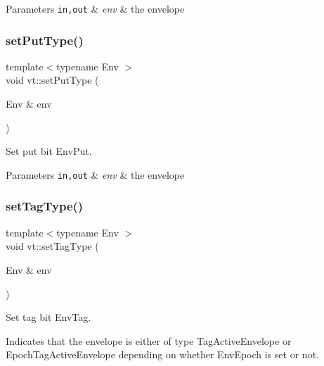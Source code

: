 \begin{DoxyParams}[1]{Parameters}
\mbox{\tt in,out}  & {\em env} & the envelope \\
\hline
\end{DoxyParams}
\mbox{\label{namespacevt_ab25ac0a12270d261c2f5c3c634f6370e}} 
\subsubsection{\texorpdfstring{set\+Put\+Type()}{setPutType()}}
{\footnotesize\ttfamily template$<$typename Env $>$ \\
void vt\+::set\+Put\+Type (\begin{DoxyParamCaption}\item[{Env \&}]{env }\end{DoxyParamCaption})\hspace{0.3cm}{\ttfamily [inline]}}



Set put bit {\ttfamily Env\+Put}. 


\begin{DoxyParams}[1]{Parameters}
\mbox{\tt in,out}  & {\em env} & the envelope \\
\hline
\end{DoxyParams}
\mbox{\label{namespacevt_ad088db89648b82eef7ca9b4837a907cd}} 
\subsubsection{\texorpdfstring{set\+Tag\+Type()}{setTagType()}}
{\footnotesize\ttfamily template$<$typename Env $>$ \\
void vt\+::set\+Tag\+Type (\begin{DoxyParamCaption}\item[{Env \&}]{env }\end{DoxyParamCaption})\hspace{0.3cm}{\ttfamily [inline]}}



Set tag bit {\ttfamily Env\+Tag}. 

Indicates that the envelope is either of type {\ttfamily Tag\+Active\+Envelope} or {\ttfamily Epoch\+Tag\+Active\+Envelope} depending on whether {\ttfamily Env\+Epoch} is set or not.


